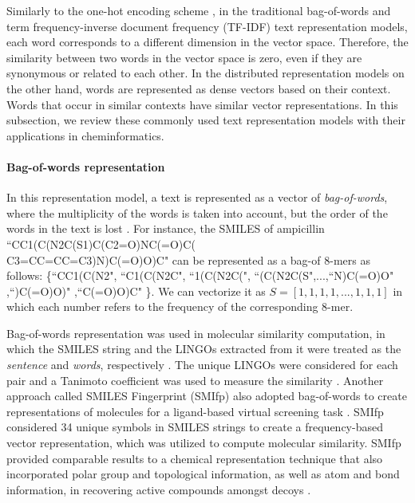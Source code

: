 \documentclass[review]{elsarticle}
\begin{document}
Similarly to the one-hot encoding scheme \cite{bishop2006pattern}, in the traditional bag-of-words \cite{turney2010frequency}  and term frequency-inverse document frequency (TF-IDF) \cite{jones2004statistical}  text representation models, each word corresponds to a different dimension in the vector space. Therefore, the similarity between two words in the vector space is zero, even if they are synonymous or related to each other. In the distributed representation models \cite{mikolov2013distributed} on the other hand, words are represented as dense vectors based on their context. Words that occur in similar contexts have similar vector representations.  In this subsection, we review these commonly used text representation models with their applications in cheminformatics.  
 

\paragraph{Bag-of-words representation} In this representation model, a text is represented as a vector of \textit{bag-of-words}, where the multiplicity of the words is taken into account, but the order of the words in the text is lost \cite{turney2010frequency}. For instance, the SMILES of ampicillin ``CC1(C(N2C(S1)C(C2=O)NC(=O)C(\\C3=CC=CC=C3)N)C(=O)O)C" can be represented as a bag-of $8$-mers as follows: \{``CC1(C(N2", ``C1(C(N2C", ``1(C(N2C(", ``(C(N2C(S",...,``N)C(=O)O" ,``)C(=O)O)" ,``C(=O)O)C" \}.  We can vectorize it as $S = [1, 1, 1, 1, ...,1, 1, 1]$ in which each number refers to the frequency of the corresponding $8$-mer.


Bag-of-words representation was used in  molecular similarity computation, in which the SMILES string and the LINGOs extracted from it were treated as the \textit{sentence} and \textit{words}, respectively \cite{vidal2005}. The unique LINGOs were considered for each pair and a Tanimoto coefficient was used to measure the similarity \cite{vidal2005}. Another approach called SMILES Fingerprint (SMIfp) also adopted bag-of-words to create representations of molecules for a ligand-based virtual screening task \cite{schwartz2013smifp}. SMIfp considered 34 unique symbols in SMILES strings to create a frequency-based vector representation, which was utilized to compute molecular similarity. SMIfp provided comparable results to a chemical representation technique that also incorporated polar group and topological information, as well as atom and bond information, in recovering active compounds amongst decoys \cite{schwartz2013smifp}. 
\end{document}
